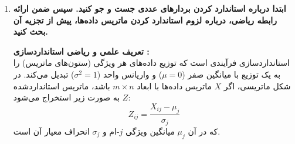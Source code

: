 \documentclass{article}
\begin{document}
\begin{enumerate}
\begin{itemize}
        \vspace{0.3cm}
        \item \textbf{معیار شباهت کسینوسی :}
        شباهت کسینوسی اندازه زاویه بین دو بردار را می‌سنجد و در فضای پردازش متن () کاربرد فراوانی دارد، زیرا مستقل از طول اسناد (بزرگی بردارها) عمل کرده و صرفاً جهت‌گیری معنایی را ارزیابی می‌کند.
        
        \textbf{رابطه ریاضی:} این معیار برابر با حاصل‌ضرب داخلی نرمال‌شده‌ی دو بردار است:
        \[
        \text{Sim}_{cos}(\mathbf{A}, \mathbf{B}) = \cos(\theta) = \frac{\langle \mathbf{A}, \mathbf{B} \rangle}{\|\mathbf{A}\|_2 \|\mathbf{B}\|_2} = \frac{\sum_{i=1}^{n} A_i B_i}{\sqrt{\sum_{i=1}^{n} A_i^2} \sqrt{\sum_{i=1}^{n} B_i^2}}
        \]
        
        \textbf{تفسیر کرانه‌ها:}
        \begin{itemize}
            \item \textbf{بیشینه (۱):} نشان‌دهنده زاویه $\theta = 0^\circ$ است. یعنی دو بردار دقیقاً هم‌راستا () هستند و حداکثر شباهت موضوعی را دارند.
            \item \textbf{مقدار صفر (۰):} نشان‌دهنده زاویه $\theta = 90^\circ$ است. دو بردار متعامد () هستند و هیچ همپوشانی و شباهتی با هم ندارند.
            \item \textbf{کمینه (۱-):} نشان‌دهنده زاویه $\theta = 180^\circ$ است. دو بردار در خلاف جهت هم قرار دارند (تضاد کامل).
        \end{itemize}
        
        \textbf{نکته تحلیلی (ارتباط دو معیار):} اگر بردارهای $\mathbf{A}$ و $\mathbf{B}$ نرمال‌سازی شوند (یعنی $\|\mathbf{A}\| = \|\mathbf{B}\| = 1$)، رابطه مستقیم زیر بین فاصله اقلیدسی و شباهت کسینوسی برقرار است:
        \[
        d^2(\mathbf{A}, \mathbf{B}) = \|\mathbf{A} - \mathbf{B}\|^2 = \|\mathbf{A}\|^2 + \|\mathbf{B}\|^2 - 2\langle \mathbf{A}, \mathbf{B} \rangle = 2 - 2\cos(\theta)
        \]
    \end{itemize}

    \vspace{0.5cm}
    \item \textbf{ابتدا درباره استاندارد کردن بردارهای عددی جست و جو کنید. سپس ضمن ارائه رابطه ریاضی، درباره لزوم استاندارد کردن ماتریس داده‌ها، پیش از تجزیه آن بحث کنید.}

    \vspace{0.3cm}
    \textbf{تعریف علمی و ریاضی استانداردسازی :} \\
    استانداردسازی فرآیندی است که توزیع داده‌های هر ویژگی (ستون‌های ماتریس) را به یک توزیع با میانگین صفر ($\mu = 0$) و واریانس واحد ($\sigma^2 = 1$) تبدیل می‌کند. در شکل ماتریسی، اگر $X$ ماتریس داده‌ها با ابعاد $m \times n$ باشد، ماتریس استانداردشده $Z$ به صورت زیر استخراج می‌شود:
    \[
    Z_{ij} = \frac{X_{ij} - \mu_j}{\sigma_j}
    \]
    که در آن $\mu_j$ میانگین ویژگی $j$-ام و $\sigma_j$ انحراف معیار آن است.


\end{enumerate}
\end{document}
